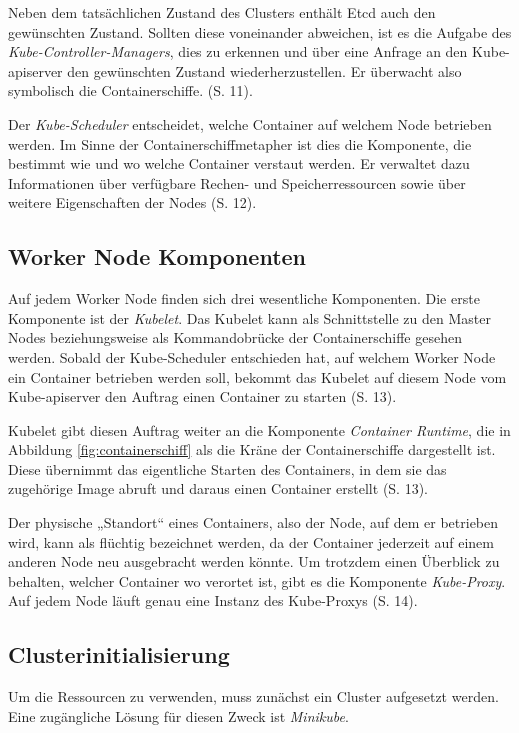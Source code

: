 \documentclass[11pt,a4paper]{article}
\begin{document}
Neben dem tatsächlichen Zustand des Clusters enthält Etcd auch den gewünschten Zustand.
Sollten diese voneinander abweichen, ist es die Aufgabe des \emph{Kube-Controller-Managers},
dies zu erkennen und über eine Anfrage an den Kube-apiserver den gewünschten Zustand wiederherzustellen.
Er überwacht also symbolisch die Containerschiffe. \cite{Schmeling_Dargatz_2022} (S. 11).

Der \emph{Kube-Scheduler} entscheidet, welche Container auf welchem Node betrieben werden.
Im Sinne der Containerschiffmetapher ist dies die Komponente, die bestimmt
wie und wo welche Container verstaut werden.
Er verwaltet dazu Informationen über verfügbare Rechen- und Speicherressourcen sowie über weitere Eigenschaften
der Nodes \cite{Schmeling_Dargatz_2022} (S. 12).

\subsection{Worker Node Komponenten}
\label{sec:WorkerNodeKomponenten}
Auf jedem Worker Node finden sich drei wesentliche Komponenten.
Die erste Komponente ist der \emph{Kubelet}. Das Kubelet kann als Schnittstelle
zu den Master Nodes beziehungsweise als Kommandobrücke der Containerschiffe gesehen werden.
Sobald der Kube-Scheduler entschieden hat, auf welchem
Worker Node ein Container betrieben werden soll, bekommt das Kubelet auf diesem Node
vom Kube-apiserver den Auftrag einen Container zu starten \cite{Schmeling_Dargatz_2022} (S. 13).

Kubelet gibt diesen Auftrag weiter an die Komponente \emph{Container Runtime}, die
in Abbildung \ref{fig:containerschiff} als die Kräne der Containerschiffe dargestellt ist.
Diese übernimmt das eigentliche Starten des Containers, in dem sie das zugehörige Image
abruft und daraus einen Container erstellt \cite{Schmeling_Dargatz_2022} (S. 13).

Der physische „Standort“ eines Containers, also der Node, auf dem er betrieben wird, kann als
flüchtig bezeichnet werden, da der Container jederzeit auf einem anderen Node neu ausgebracht werden könnte.
Um trotzdem einen Überblick zu behalten, welcher Container wo verortet ist, gibt es die Komponente
\emph{Kube-Proxy}. Auf jedem Node läuft genau eine Instanz des Kube-Proxys \cite{Schmeling_Dargatz_2022} (S. 14).

\subsection{Clusterinitialisierung}
Um die Ressourcen zu verwenden, muss zunächst ein Cluster aufgesetzt werden.
Eine zugängliche Lösung für diesen Zweck ist \emph{Minikube}.
\end{document}
